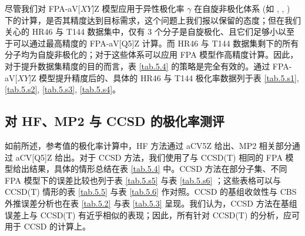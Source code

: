 \begin{table}[!ht]
\centering
\caption{HR46 与 T144 子集下异性极化率 $\symup{\Delta} \tilde \gamma_\textsf{CCSD(T)}$ 在不同 FPA 模型下的相对方均根误差\textrm{\textsuperscript{\emph{a}}}。}
\label{tab.5.6}
\end{table}

尽管我们对 FPA-aV[$XY$]Z 模型应用于异性极化率 $\gamma$ 在自旋非极化体系 (如 , , ) 下的计算，是否其精度达到目标需求，这个问题上我们报以保留的态度；但在我们关心的 HR46 与 T144 数据集中，仅有 3 个分子是自旋极化、且它们足够小以至于可以通过最高精度的 FPA-aV[Q5]Z 计算。而 HR46 与 T144 数据集剩下的所有分子均为自旋非极化的；对于这些体系可以应用 FPA 模型作高精度计算。因此，对于提升数据集精度的目的而言，表 \ref{tab.5.4} 的策略是完全有效的。通过 FPA-aV[$XY$]Z 模型提升精度后的、具体的 HR46 与 T144 极化率数据列于表 \ref{tab.5.s1}, \ref{tab.5.s2}, \ref{tab.5.s3}, \ref{tab.5.s4}。

\subsection{对 HF、MP2 与 CCSD 的极化率测评}
\label{sec.5.bench-wft-polar}

如前所述，参考值的极化率计算中，HF 方法通过 aCV5Z 给出、MP2 相关部分通过 aCV[Q5]Z 给出。对于 CCSD 方法，我们使用了与 CCSD(T) 相同的 FPA 模型给出结果，具体的情形总结在表 \ref{tab.5.4} 中。CCSD 方法在部分子集、不同 FPA 模型下的误差比较也列于表 \ref{tab.5.s5} 与表 \ref{tab.5.s6} ；这些表格可以与 CCSD(T) 情形的表 \ref{tab.5.5} 与表 \ref{tab.5.6} 作对照。CCSD 的基组收敛性与 CBS 外推误差分析也在表 \ref{tab.5.2} 与表 \ref{tab.5.3} 呈现。我们认为，CCSD 方法在基组误差上与 CCSD(T) 有近乎相似的表现；因此，所有针对 CCSD(T) 的分析，应可用于 CCSD 的计算上。

